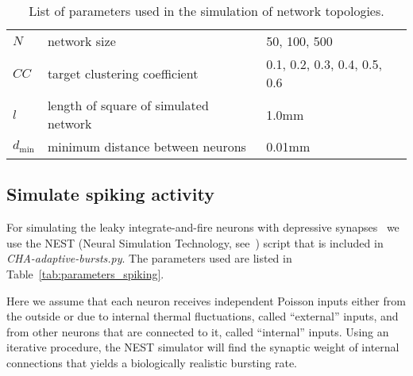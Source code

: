 \documentclass[a4paper,11pt]{article}
\begin{document}
\begin{table}[ht]
  \begin{center}
    \begin{tabular}
      {|ll|l|} %
      \hline
      $N$ & network size & 50, 100, 500 \\
      $CC$ & target clustering coefficient & 0.1, 0.2, 0.3, 0.4, 0.5, 0.6 \\
      $l$ & length of square of simulated network & 1.0mm \\
      $d_{\text{min}}$ & minimum distance between neurons & 0.01mm \\
      \hline
    \end{tabular}
  \end{center}
  \caption{List of parameters used in the simulation of network topologies.}
  \label{tab:parameters_topos}
\end{table}


\subsection{Simulate spiking activity}

For simulating the leaky integrate-and-fire neurons with depressive synapses~\cite{Tsodyks:1997p5532,Tsodyks:2000p3237} we use the NEST (Neural Simulation Technology, see~\cite{Gewaltig:NEST}) script that is included in \emph{CHA-adaptive-bursts.py}.
The parameters used are listed in Table~\ref{tab:parameters_spiking}.

Here we assume that each neuron receives independent Poisson inputs either from the outside or due to internal thermal fluctuations, called ``external'' inputs, and from other neurons that are connected to it, called ``internal'' inputs.
Using an iterative procedure, the NEST simulator will find the synaptic weight of internal connections that yields a biologically realistic bursting rate.
\end{document}
